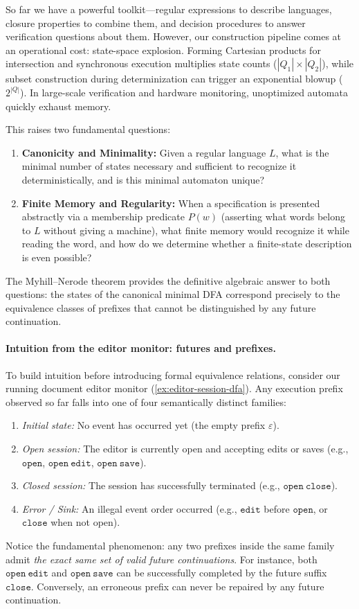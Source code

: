 So far we have a powerful toolkit---regular expressions to describe languages, closure properties to combine them, and decision procedures to answer verification questions about them. However, our construction pipeline comes at an operational cost: state-space explosion. Forming Cartesian products for intersection and synchronous execution multiplies state counts ($|Q_1| \times |Q_2|$), while subset construction during determinization can trigger an exponential blowup ($2^{|Q|}$). In large-scale verification and hardware monitoring, unoptimized automata quickly exhaust memory.

This raises two fundamental questions:
\begin{enumerate}[nosep]
  \item \textbf{Canonicity and Minimality:} Given a regular language $L$, what is the minimal number of states necessary and sufficient to recognize it deterministically, and is this minimal automaton unique?
  \item \textbf{Finite Memory and Regularity:} When a specification is presented abstractly via a membership predicate $P(w)$ (asserting what words belong to $L$ without giving a machine), what finite memory would recognize it while reading the word, and how do we determine whether a finite-state description is even possible?
\end{enumerate}
The Myhill--Nerode theorem provides the definitive algebraic answer to both questions: the states of the canonical minimal DFA correspond precisely to the equivalence classes of prefixes that cannot be distinguished by any future continuation.

\paragraph{Intuition from the editor monitor: futures and prefixes.}
To build intuition before introducing formal equivalence relations, consider our running document editor monitor (\cref{ex:editor-session-dfa}). Any execution prefix observed so far falls into one of four semantically distinct families:
\begin{enumerate}[nosep]
  \item \emph{Initial state:} No event has occurred yet (the empty prefix $\varepsilon$).
  \item \emph{Open session:} The editor is currently open and accepting edits or saves (e.g., $\texttt{open}$, $\texttt{open}\ \texttt{edit}$, $\texttt{open}\ \texttt{save}$).
  \item \emph{Closed session:} The session has successfully terminated (e.g., $\texttt{open}\ \texttt{close}$).
  \item \emph{Error / Sink:} An illegal event order occurred (e.g., $\texttt{edit}$ before $\texttt{open}$, or $\texttt{close}$ when not open).
\end{enumerate}
Notice the fundamental phenomenon: any two prefixes inside the same family admit \emph{the exact same set of valid future continuations}. For instance, both $\texttt{open}\ \texttt{edit}$ and $\texttt{open}\ \texttt{save}$ can be successfully completed by the future suffix $\texttt{close}$. Conversely, an erroneous prefix can never be repaired by any future continuation. 

